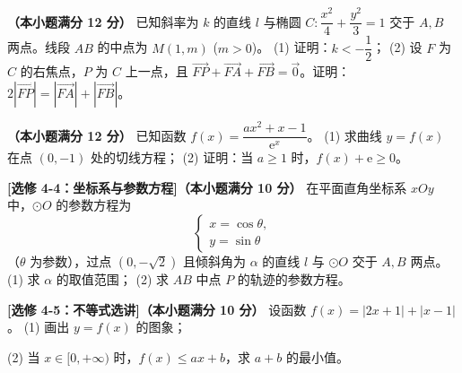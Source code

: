 \begin{question}
\textbf{（本小题满分 12 分）} 
已知斜率为 $k$ 的直线 $l$ 与椭圆 $C: \dfrac{x^2}{4} + \dfrac{y^2}{3} = 1$ 交于 $A, B$ 两点。线段 $AB$ 的中点为 $M(1, m)$ ($m > 0$)。
(1) 证明：$k < -\dfrac12$；
(2) 设 $F$ 为 $C$ 的右焦点，$P$ 为 $C$ 上一点，且 $\vec{FP} + \vec{FA} + \vec{FB} = \vec{0}$。证明：$2|\vec{FP}| = |\vec{FA}| + |\vec{FB}|$。

\end{question}
\begin{question}
\textbf{（本小题满分 12 分）} 
已知函数 $f(x) = \dfrac{ax^2 + x - 1}{\mathrm e^x}$。
(1) 求曲线 $y = f(x)$ 在点 $(0, -1)$ 处的切线方程；
(2) 证明：当 $a \geqslant 1$ 时，$f(x) + \mathrm e \geqslant 0$。

\par\medskip

\end{question}

\begin{question}
\textbf{[选修 4-4：坐标系与参数方程]（本小题满分 10 分）} 
在平面直角坐标系 $xOy$ 中，$\odot O$ 的参数方程为
\nopagebreak[4]
\[
\begin{cases}
x = \cos\theta, \\
y = \sin\theta
\end{cases}
\]
（$\theta$ 为参数），过点 $(0, -\sqrt2)$ 且倾斜角为 $\alpha$ 的直线 $l$ 与 $\odot O$ 交于 $A, B$ 两点。
(1) 求 $\alpha$ 的取值范围；
(2) 求 $AB$ 中点 $P$ 的轨迹的参数方程。

\Needspace{0.4\textheight}
\end{question}
\begin{question}
\textbf{[选修 4-5：不等式选讲]（本小题满分 10 分）} 
设函数 $f(x) = |2x + 1| + |x - 1|$。
(1) 画出 $y = f(x)$ 的图象；
\nopagebreak[4]
\begin{center}\end{center}
\nopagebreak[4]
(2) 当 $x \in [0, +\infty)$ 时，$f(x) \leqslant ax + b$，求 $a + b$ 的最小值。

\end{question}